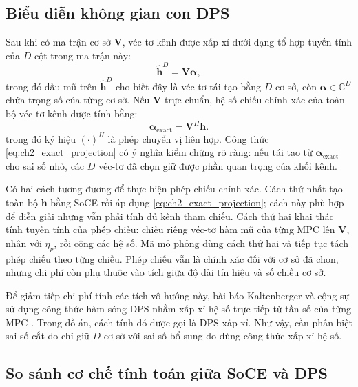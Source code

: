 \subsection{Biểu diễn không gian con DPS}
\label{subsec:ch2_dps_subspace}

Sau khi có ma trận cơ sở \(\mathbf{V}\), véc-tơ kênh được xấp xỉ dưới dạng tổ hợp tuyến tính của \(D\) cột trong ma trận này:
\begin{equation}
\hat{\mathbf{h}}^{D}=\mathbf{V}\boldsymbol{\alpha},
\label{eq:ch2_dps_reconstruction}
\end{equation}
trong đó dấu mũ trên \(\hat{\mathbf{h}}^{D}\) cho biết đây là véc-tơ tái tạo bằng \(D\) cơ sở, còn \(\boldsymbol{\alpha}\in\mathbb{C}^{D}\) chứa trọng số của từng cơ sở. Nếu \(\mathbf{V}\) trực chuẩn, hệ số chiếu chính xác của toàn bộ véc-tơ kênh được tính bằng:
\begin{equation}
\boldsymbol{\alpha}_{\mathrm{exact}}
= \mathbf{V}^{H}\mathbf{h}.
\label{eq:ch2_exact_projection}
\end{equation}
trong đó ký hiệu \((\cdot)^H\) là phép chuyển vị liên hợp. Công thức \eqref{eq:ch2_exact_projection} có ý nghĩa kiểm chứng rõ ràng: nếu tái tạo từ \(\boldsymbol{\alpha}_{\mathrm{exact}}\) cho sai số nhỏ, các \(D\) véc-tơ đã chọn giữ được phần quan trọng của khối kênh.

Có hai cách tương đương để thực hiện phép chiếu chính xác. Cách thứ nhất tạo toàn bộ \(\mathbf{h}\) bằng SoCE rồi áp dụng \eqref{eq:ch2_exact_projection}; cách này phù hợp để diễn giải nhưng vẫn phải tính đủ kênh tham chiếu. Cách thứ hai khai thác tính tuyến tính của phép chiếu: chiếu riêng véc-tơ hàm mũ của từng MPC lên \(\mathbf{V}\), nhân với \(\eta_p\), rồi cộng các hệ số. Mã mô phỏng dùng cách thứ hai và tiếp tục tách phép chiếu theo từng chiều. Phép chiếu vẫn là chính xác đối với cơ sở đã chọn, nhưng chi phí còn phụ thuộc vào tích giữa độ dài tín hiệu và số chiều cơ sở.

Để giảm tiếp chi phí tính các tích vô hướng này, bài báo Kaltenberger và cộng sự sử dụng công thức hàm sóng DPS nhằm xấp xỉ hệ số trực tiếp từ tần số của từng MPC \cite{Kaltenberger2007}. Trong đồ án, cách tính đó được gọi là DPS xấp xỉ. Như vậy, cần phân biệt sai số cắt do chỉ giữ \(D\) cơ sở với sai số bổ sung do dùng công thức xấp xỉ hệ số.

\subsection{So sánh cơ chế tính toán giữa SoCE và DPS}
\label{subsec:ch2_soce_dps_compare}

